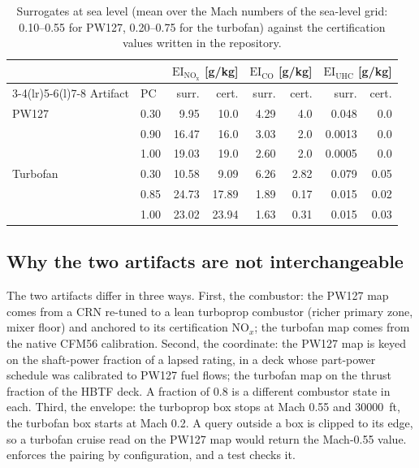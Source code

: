\documentclass[a4paper,11pt]{article}
\newcommand{\EI}[1]{\mathrm{EI}_{\mathrm{#1}}}
\begin{document}
\begin{table}[htbp]
\centering\small
\caption{Surrogates at sea level (mean over the Mach numbers of the sea-level grid: 0.10--0.55
for PW127, 0.20--0.75 for the turbofan) against the certification values written in the
repository.}\label{tab:em-cert}
\begin{tabular}{@{}llrrrrrr@{}}
\toprule
 & & \multicolumn{2}{c}{$\EI{NO_x}$ [g/kg]} & \multicolumn{2}{c}{$\EI{CO}$ [g/kg]} & \multicolumn{2}{c}{$\EI{UHC}$ [g/kg]} \\
\cmidrule(lr){3-4}\cmidrule(lr){5-6}\cmidrule(l){7-8}
Artifact & PC & surr. & cert. & surr. & cert. & surr. & cert. \\
\midrule
PW127 & 0.30 & 9.95 & 10.0 & 4.29 & 4.0 & 0.048 & 0.0 \\
 & 0.90 & 16.47 & 16.0 & 3.03 & 2.0 & 0.0013 & 0.0 \\
 & 1.00 & 19.03 & 19.0 & 2.60 & 2.0 & 0.0005 & 0.0 \\
Turbofan & 0.30 & 10.58 & 9.09 & 6.26 & 2.82 & 0.079 & 0.05 \\
 & 0.85 & 24.73 & 17.89 & 1.89 & 0.17 & 0.015 & 0.02 \\
 & 1.00 & 23.02 & 23.94 & 1.63 & 0.31 & 0.015 & 0.03 \\
\bottomrule
\end{tabular}
\end{table}

\subsection{Why the two artifacts are not interchangeable}
The two artifacts differ in three ways. First, the combustor: the PW127 map comes from a CRN
re-tuned to a lean turboprop combustor (richer primary zone, mixer floor) and anchored to its
certification NO$_x$; the turbofan map comes from the native CFM56 calibration. Second, the
coordinate: the PW127 map is keyed on the shaft-power fraction of a lapsed rating, in a deck
whose part-power schedule was calibrated to PW127 fuel flows; the turbofan map on the thrust
fraction of the HBTF deck. A fraction of 0.8 is a different combustor state in each. Third, the envelope: the
turboprop box stops at Mach 0.55 and \SI{30000}{ft}, the turbofan box starts at Mach 0.2. A
query outside a box is clipped to its edge, so a turbofan cruise read on the PW127 map would
return the Mach-0.55 value.  enforces the pairing by configuration, and
a test checks it.

\end{document}
